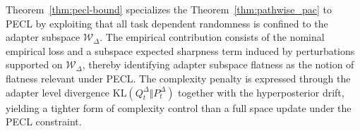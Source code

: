 \documentclass{article}
\theoremstyle{plain}
\theoremstyle{definition}
\theoremstyle{remark}
\begin{document}
Theorem~\ref{thm:pecl-bound} specializes the Theorem~\ref{thm:pathwise_pac} to PECL by exploiting that all task dependent randomness is confined to the adapter subspace $\mathcal W_\Delta$.
The empirical contribution consists of the nominal empirical loss and a subspace expected sharpness term induced by perturbations supported on $\mathcal W_\Delta$, thereby identifying adapter subspace flatness as the notion of flatness relevant under PECL.
The complexity penalty is expressed through the adapter level divergence $\mathrm{KL}(Q_t^\Delta\Vert P_t^\Delta)$ together with the hyperposterior drift, yielding a tighter form of complexity control than a full space update under the PECL constraint.




\end{document}
